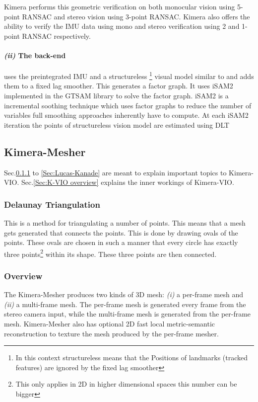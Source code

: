 \documentclass[11pt,a4paper]{article}
\begin{document}
Kimera performs this geometric verification on both monocular vision using 5-point RANSAC and stereo vision using 3-point RANSAC.
Kimera also offers the ability to verify the IMU data using mono and stereo verification using 2 and 1-point RANSAC respectively.

\paragraph{\textit{(ii)} The back-end}
uses the preintegrated IMU and a structureless \footnote{In this context structureless means that the Positions of landmarks (tracked features) are ignored by the fixed lag smoother} visual model similar to \cite{Forster_2017} and adds them to a fixed lag smoother. 
This generates a factor graph. It uses iSAM2 implemented in the GTSAM library to solve the factor graph. 
iSAM2 is a incremental soothing technique which uses factor graphs to reduce the number of variables full smoothing approaches inherently have to compute. 
At each iSAM2 iteration the points of structureless vision model are estimated using DLT 

\subsection{Kimera-Mesher}
Sec.\ref{pre:delaunay} to \ref{Sec:Lucas-Kanade} are meant to explain important topics to Kimera-VIO.
Sec.\ref{Sec:K-VIO overview} explains the inner workings of Kimera-VIO.
\subsubsection{Delaunay Triangulation} \label{pre:delaunay}
This is a method for triangulating a number of points. This means that a mesh gets generated that connects the points.
This is done by drawing ovals of the points. 
These ovals are chosen in such a manner that every circle has exactly three points\footnote{This only applies in 2D in higher dimensional spaces this number can be bigger} within its shape. 
These three points are then connected.  
\subsubsection{Overview}
The Kimera-Mesher produces two kinds of 3D mesh: \textit{(i)} a per-frame mesh and \textit{(ii)} a multi-frame mesh. The per-frame mesh is generated every frame from the stereo camera input, while the multi-frame mesh is generated from the per-frame mesh.
Kimera-Mesher also has optional 2D fast local metric-semantic reconstruction to texture the mesh produced by the per-frame mesher.
\end{document}
